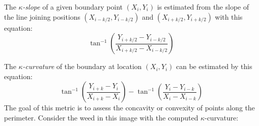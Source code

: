 \documentclass[letterpaper]{article}
\begin{document}
{{The \textit{$\kappa$-slope} of a given boundary point $(X_i, Y_i)$ is estimated from the slope of the line joining positions $(X_{i-k/2}, Y_{i-k/2})$ and $(X_{i+k/2}, Y_{i+k/2})$ with this equation:
\begin{equation}
\tan^{-1}\left(\frac{Y_{i+k/2} - Y_{i-k/2}}{X_{i+k/2} - X_{i-k/2}}\right)
\end{equation}
 
 The \textit{$\kappa$-curvature} of the boundary at location $(X_i,Y_i)$ can be estimated by this equation:
 \begin{equation}
 \tan^{-1}\left(\frac{Y_{i+k} - Y_{i}}{X_{i+k} - X_{i}}\right) - \tan^{-1}\left(\frac{Y_{i} - Y_{i-k}}{X_{i} - X_{i-k} }\right)
 \end{equation}
 The goal of this metric is to assess the concavity or convexity of points along the perimeter. Consider the weed in this image with the computed $\kappa$-curvature:
 
}}
\end{document}
